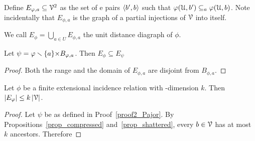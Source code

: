 \documentclass[sputnik.tex]{subfiles}
\begin{document}
Define $E_{\varphi,a}\subseteq\EuScript V^2$ as the set of e pairs $\langle b',b\rangle$ such that $\varphi(\EuScript U,b')\subseteq_a\varphi(\EuScript U,b)$. 
Note incidentally that $E_{\phi,a}$ is the graph of a partial injections of $\EuScript V$ into itself. 

We call $\displaystyle E_\phi=\bigcup_{a\in U}E_{\phi,a}$ the unit distance diagraph of $\phi$. 

\begin{proposition}\label{prop_udd1} 
Let $\psi=\varphi\smallsetminus\{a\}{\times}B_{\varphi,a}$. Then $E_{\phi}\subseteq E_{\psi}$
\end{proposition}
\begin{proof}Both the range and the domain of $E_{\phi,a}$ are disjoint from $B_{\phi,a}$.
\end{proof}

\begin{proposition}
Let $\phi$ be a finite extensional incidence relation with \vc-dimension $k$.
Then $|E_\varphi|\le k\,|\EuScript V|$.
\end{proposition}

\begin{proof}
Let $\psi$ be as defined in Proof~\ref{proof2_Pajor}.
By Propositions~\ref{prop_compressed} and~\ref{prop_shattered}, every $b\in\EuScript V$ has at most $k$ ancestors.
Therefore

\end{proof}
\end{document}
